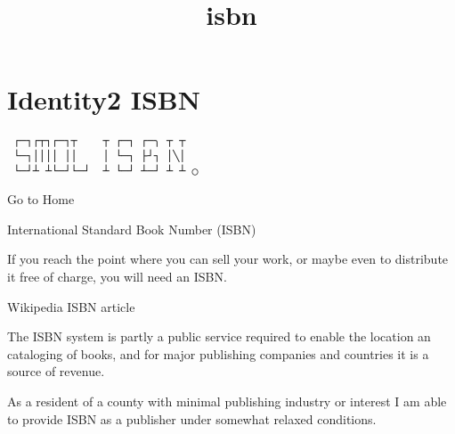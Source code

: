 \documentclass[
]{article}
\title{isbn}
\author{}
\date{}
\begin{document}
\maketitle

\section{Identity2 ISBN}

\begin{verbatim}
 ┌─┐┌┬┐┌─┐┬    ┬ ┌─┐ ┌─╮ ┬ ┬
 └─┐││││ ││    │ └─┐ ├┘┐ │╲│
 └─┘┴ ┴└─┘└─┘  ┴ └─┘ ┴─┘ ┴ ┴ ○
\end{verbatim}

Go to Home

International Standard Book Number (ISBN)

If you reach the point where you can sell your work, or maybe even to
distribute it free of charge, you will need an ISBN.

Wikipedia ISBN article

The ISBN system is partly a public service required to enable the
location an cataloging of books, and for major publishing companies and
countries it is a source of revenue.

As a resident of a county with minimal publishing industry or interest I
am able to provide ISBN as a publisher under somewhat relaxed
conditions.
\end{document}

